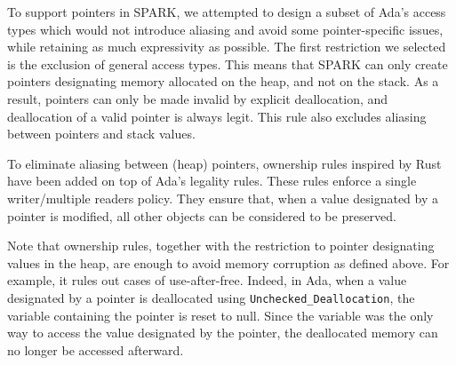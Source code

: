 \documentclass[runningheads]{llncs}
\begin{document}
To support pointers in SPARK, we attempted to design a subset of Ada’s access types which would not introduce aliasing and avoid some pointer-specific issues, while retaining as much expressivity as possible. The first restriction we selected is the exclusion of general access types. This means that SPARK can only create pointers designating memory allocated on the heap, and not on the stack. As a result, pointers can only be made invalid by explicit deallocation, and deallocation of a valid pointer is always legit. This rule also excludes aliasing between pointers and stack values.

To eliminate aliasing between (heap) pointers, ownership rules inspired by Rust have been added on top of Ada’s legality rules. These rules enforce a single writer/multiple readers policy. They ensure that, when a value designated by a pointer is modified, all other objects can be considered to be preserved.

Note that ownership rules, together with the restriction to pointer designating values in the heap, are enough to avoid memory corruption as defined above. For example, it rules out cases of use-after-free. Indeed, in Ada, when a value designated by a pointer is deallocated using \texttt{Unchecked\_Deallocation}, the variable containing the pointer is reset to null. Since the variable was the only way to access the value designated by the pointer, the deallocated memory can no longer be accessed afterward.
\end{document}
